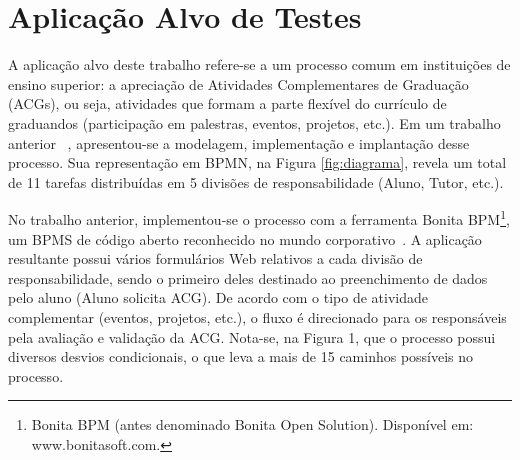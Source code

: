 \documentclass[12pt]{article}
\begin{document}






\section{Aplicação Alvo de Testes}\label{s:apli}

A aplicação alvo deste trabalho refere-se a um processo comum em instituições de ensino superior: a apreciação de Atividades Complementares de Graduação (ACGs), ou seja, atividades que formam a parte flexível do currículo de graduandos (participação em palestras, eventos, projetos, etc.). Em um trabalho anterior ~\cite{sbsi2013}, apresentou-se a modelagem, implementação e implantação desse processo. Sua representação em BPMN, na Figura \ref{fig:diagrama}, revela um total de 11 tarefas distribuídas em 5 divisões de responsabilidade (Aluno, Tutor, etc.).

No trabalho anterior, implementou-se o processo com a ferramenta Bonita BPM\footnote{Bonita BPM (antes denominado Bonita Open Solution). Disponível em: www.bonitasoft.com.}, um BPMS de código aberto reconhecido no mundo corporativo~\cite{forrester}. A aplicação resultante possui vários formulários Web relativos a cada divisão de responsabilidade, sendo o primeiro deles destinado ao preenchimento de dados pelo aluno (Aluno solicita ACG). De acordo com o tipo de atividade complementar (eventos, projetos, etc.), o fluxo é direcionado para os responsáveis pela avaliação e validação da ACG. Nota-se, na Figura 1, que o processo possui diversos desvios condicionais, o que leva a mais de 15 caminhos possíveis no processo.
\end{document}

